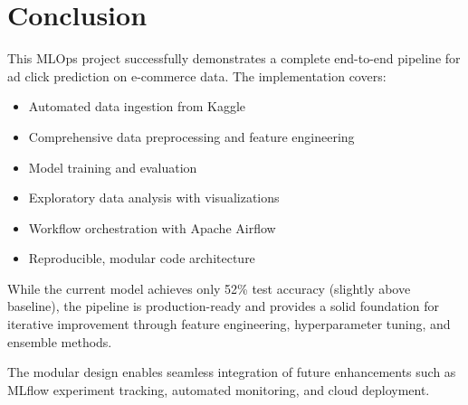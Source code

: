 \documentclass[11pt,a4paper]{article}
\begin{document}
\section{Conclusion}

This MLOps project successfully demonstrates a complete end-to-end pipeline for ad click
prediction on e-commerce data. The implementation covers:

\begin{itemize}[leftmargin=1.5em, itemsep=2pt]
  \item Automated data ingestion from Kaggle
  \item Comprehensive data preprocessing and feature engineering
  \item Model training and evaluation
  \item Exploratory data analysis with visualizations
  \item Workflow orchestration with Apache Airflow
  \item Reproducible, modular code architecture
\end{itemize}

While the current model achieves only 52\% test accuracy (slightly above baseline), 
the pipeline is production-ready and provides a solid foundation for iterative improvement 
through feature engineering, hyperparameter tuning, and ensemble methods.

The modular design enables seamless integration of future enhancements such as MLflow 
experiment tracking, automated monitoring, and cloud deployment.
\end{document}
